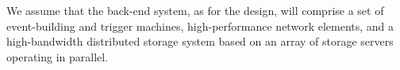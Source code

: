  We assume that the  back-end system, as for the  design, will comprise a set of event-building and trigger machines, high-performance network elements, and a high-bandwidth distributed storage system based on an array of storage servers operating in parallel. 
 \begin{comment}
 In particular, the \dword{daq} system is expected to

\begin{itemize}
\item Collect the high-bandwidth data volume coming from the data links of the \dword{fe} digitization crates; 
\item Put together the data streams from different crates in \dword{roi} or over the entire detector volume (An \dword{roi} is typically the size of a \dword{pddp} four-\dword{crp} surface because events are contained in such a region.);
\item Process this data flow using an online trigger farm  as a prelude to selecting relevant events to be recorded on disk (both neutrino beam and off-beam events);
\item Produce charge-readout triggers independently of the light-readout triggers and beam-spill information. 
(For \dword{snb} events in particular, the trigger farm would issue triggers over a sliding timing window of approximately \SI{10}{s}  based on the presence of low-energy depositions; the entire content would be dumped to disk.).
\end{itemize}

The \dword{dp} readout architecture can be organized into \num{20} \dwords{roi}, each similar to the \dword{pddp} back-end architecture. Triggers are searched on the level-1 event builder machines, interconnecting multiple \dword{utca} crates, on a sliding windows of \SI{10}{s}  contained in the event builder RAM.

The event builders combine continuous lossless, compressed data (streaming from the charge readout) with beam data and light data to define the window $t_0$ and select disk streams from beam events, cosmics, and \dword{snb} events. Data decompression is necessary on the event builders in order to perform the charge data analysis for trigger definition. Compressed data are kept in memory, while the trigger definition analysis is performed, for further writing to disk from level-2 machines from the output streams: beam, cosmics and proton decay, and \dword{snb}. 

The level-1 event builders exchange trigger primitive data on the network with a global supervisor machine, which then decides what data to write to disk.  The supervisor can order the event builder's memory  windows dumped to disk if a certain number of candidate energy depositions is found from the charge data.  This scheme makes it possible for selected portions of different \dwords{detmodule} to communicate with one another.  
Typically for beam data and cosmic events, the amount of data written to disk can be limited to one or two \dwords{roi}; in some situations, events occur at the border between two \dwords{roi} rather than in a single one.
\end{comment}

